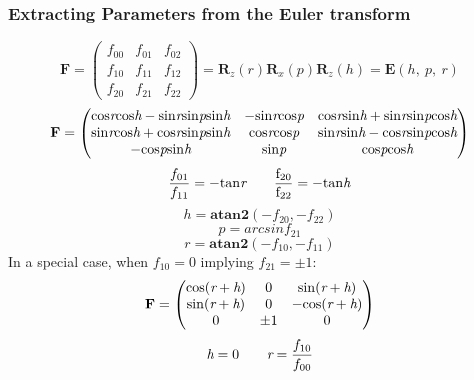 \documentclass[10pt, a4paper]{article}
\begin{document}
            \subsubsection{Extracting Parameters from the Euler transform}
                \begin{equation*}
                    \textbf{F} = 
                    \begin{pmatrix}
                        f_{00} & f_{01} & f_{02}\\
                        f_{10} & f_{11} & f_{12}\\
                        f_{20} & f_{21} & f_{22}
                    \end{pmatrix}
                    = \textbf{R}_z(r)\textbf{R}_x(p)\textbf{R}_z(h) = \textbf{E}(h,\ p,\ r)
                \end{equation*}
                \newline
                \begin{equation*}
                    \textbf{F} = 
                    \begin{pmatrix}
                        \rm{cos}\emph{r}\rm{cos}\emph{h} - \rm{sin}\emph{r}\rm{sin}\emph{p}\rm{sin}\emph{h} & 
                        -\rm{sin}\emph{r}\rm{cos}\emph{p} & 
                        \rm{cos}\emph{r}\rm{sin}\emph{h} + \rm{sin}\emph{r}\rm{sin}\emph{p}\rm{cos}\emph{h} \\
                        \rm{sin}\emph{r}\rm{cos}\emph{h} + \rm{cos}\emph{r}\rm{sin}\emph{p}\rm{sin}\emph{h} &
                        \rm{cos}\emph{r}\rm{cos}\emph{p} &
                        \rm{sin}\emph{r}\rm{sin}\emph{h} - \rm{cos}\emph{r}\rm{sin}\emph{p}\rm{cos}\emph{h} \\
                        -\rm{cos}\emph{p}\rm{sin}\emph{h} &
                        \rm{sin}\emph{p} & 
                        \rm{cos}\emph{p}\rm{cos}\emph{h}
                    \end{pmatrix} 
                \end{equation*} 
                \newline
                $$\frac{f_{01}}{f_{11}} = -\rm{tan}\emph{r}\quad\quad \frac{f_{20}}{f_{22}} = -\rm{tan}\emph{h}$$\newline
                $$h = \textbf{atan2}(-f_{20}, -f_{22})$$  $$ p = arcsin{f_{21}}$$ $$r = \textbf{atan2}(-f_{10}, -f_{11})$$
                \indent In a special case, when $f_{10} = 0 $ implying $f_{21} = \pm 1$:\newline
                \begin{equation*}
                    \textbf{F} = 
                    \begin{pmatrix}
                        \rm{cos}(\emph{r} + \emph{h}) & 0 & \rm{sin}(\emph{r} + \emph{h}) \\
                        \rm{sin}(\emph{r} + \emph{h}) & 0 & \rm{-cos}(\emph{r} + \emph{h})\\
                        0 & \pm 1 & 0 
                    \end{pmatrix} 
                \end{equation*} 
                $$\emph{h} = 0 \quad\quad \emph{r} = \frac{f_{10}}{f_{00}}$$
        
\end{document}
